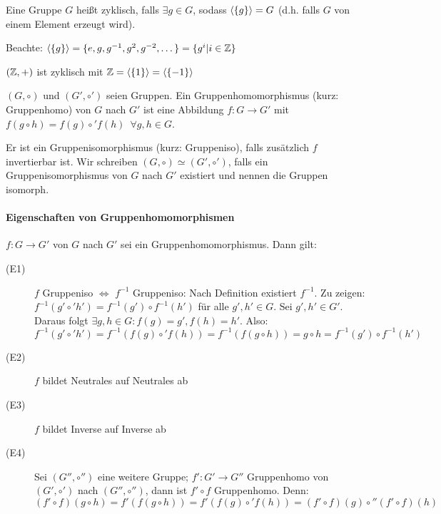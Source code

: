 \documentclass[12pt,a4paper]{scrartcl}
\begin{document}
\begin{defi}
	Eine Gruppe $G$ heißt zyklisch, falls $\exists g\in G$, sodass $\langle\{g\}\rangle = G$ (d.h. falls $G$ von einem Element erzeugt wird).
\end{defi}

\noindent Beachte: $\langle\{g\}\rangle = \{e, g, g^{-1}, g^2, g^{-2},\dots\} = \{g^i|i\in\mathbb Z\}$

\begin{bsp}

 $(\mathbb Z,+)$ ist zyklisch mit $\mathbb Z =\langle\left\lbrace 1 \right\rbrace \rangle = \langle\left\lbrace -1 \right\rbrace \rangle$

\end{bsp}

\begin{defi}
	$(G,\circ)$ und $(G',\circ')$ seien Gruppen. Ein Gruppenhomomorphismus (kurz: Gruppenhomo) von $G$ nach $G'$ ist eine Abbildung $f\colon G\to G'$ mit $f(g\circ h) = f(g)\circ'f(h)\enspace \forall g, h\in G$.
	
	Er ist ein Gruppenisomorphismus (kurz: Gruppeniso), falls zusätzlich $f$ invertierbar ist. Wir schreiben $(G,\circ)\simeq (G',\circ')$, falls ein Gruppenisomorphismus von $G$ nach $G'$ existiert und nennen die Gruppen isomorph.
\end{defi}

\paragraph{Eigenschaften von Gruppenhomomorphismen} $f\colon G\to G'$ von $G$ nach $G'$ sei ein Gruppenhomomorphismus. Dann gilt:
\begin{description}
	\item[(E1)] $f$ Gruppeniso $\Leftrightarrow$ $f^{-1}$ Gruppeniso: Nach Definition existiert $f^{-1}$. Zu zeigen: $f^{-1}(g'\circ' h')= f^{-1}(g')\circ f^{-1}(h')$ für alle $g',h'\in G$. Sei $g', h' \in G' $. Daraus folgt $ \exists g, h\in G : f(g) = g', f(h) = h'$. Also:
	\begin{equation*}
		f^{-1}(g'\circ'h')= f^{-1}(f(g)\circ'f(h)) = f^{-1}(f(g\circ h))= g\circ h  = f^{-1}(g')\circ f^{-1}(h')
	\end{equation*} 
	
	\item[(E2)] $f$ bildet Neutrales auf Neutrales ab
	
	\item[(E3)] $f$ bildet Inverse auf Inverse ab
	\item[(E4)] Sei $(G'',\circ'')$ eine weitere Gruppe; $f'\colon G'\to G''$ Gruppenhomo von $(G',\circ')$ nach $(G'',\circ'')$, dann ist $f'\circ f$ Gruppenhomo. Denn: 
	\begin{equation*}
		(f'\circ f)(g\circ h) = f'(f(g\circ h)) = f'(f(g)\circ'f(h)) = (f'\circ f)(g)\circ''(f'\circ f)(h)
	\end{equation*}
\end{description}
\end{document}
